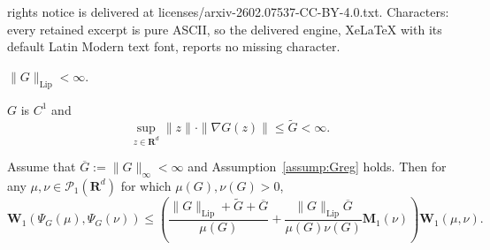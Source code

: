 \documentclass[10pt,a4paper]{amsart}
\newcommand{\M}{\mathbf{M}}
\newcommand{\R}{\mathbf{R}}
\newcommand{\W}{\mathbf{W}}
\newcommand{\calP}{\mathcal{P}}
\newcommand{\lip}{\mathrm{Lip}}
\newcommand{\ovl}[1]{\overline{#1}}
\newcommand{\wtilde}[1]{\widetilde{#1}}
\begin{document}
rights notice is delivered at licenses/arxiv-2602.07537-CC-BY-4.0.txt. Characters: every retained excerpt is pure ASCII, so the delivered engine, XeLaTeX with its default Latin Modern text font, reports no missing character.
	\begin{assumption}[Regularity of $G$]\label{assump:Greg}
		\hfill
		\begin{assumptions}[G]
			\item $\|G\|_{\lip}<\infty$.
			\item $G$ is $C^1$ and
			 \[
				\sup_{z\in \R^d}\|z\|\cdot\|\nabla G(z)\|\leq \wtilde{G}<\infty.
			\]
		\end{assumptions}
	\end{assumption}

	\begin{lemma}\label{lem:psi_reg}
		Assume that $\ovl{G}:=\|G\|_\infty< \infty$ and Assumption~\ref{assump:Greg} holds. Then for any $\mu,\nu\in\calP_1(\R^d)$ for which $\mu(G),\nu(G)>0$,
		\[
			\W_1(\Psi_G(\mu), \Psi_G(\nu))\leq \left(\frac{\|G\|_{\lip} + \wtilde{G} + \ovl{G}}{\mu(G)} + \frac{\|G\|_{\lip}\ovl{G}}{\mu(G)\nu(G)}\M_1(\nu)\right)\W_1(\mu,\nu).
		\]
	\end{lemma}
\end{document}
